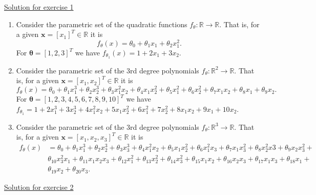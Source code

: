 \documentclass[12pt]{book}
\newcommand{\bb}[1]{\mathbb{#1}}
\newcommand{\R}{\bb{R}}
\begin{document}
{\underline{\large Solution for exercise 1}}
\vspace{0.1 cm}
\begin{enumerate}[label=(\alph*)]
	\item Consider the parametric set of the quadratic functions $f_\theta:\R \rightarrow \R$. That is, for a given $\bm{x} = [x_1]^T \in \R$ it is
	\begin{equation*}
	f_\theta(x) = \theta_0 + \theta_1x_1 + \theta_2x_1^2.
	\end{equation*}
	For $\bm{\theta} = [1,2,3]^T$ we have
	$f_{\theta{_1}}(x) = 1 + 2x_1 + 3x_2$.
	
	\item Consider the parametric set of the 3rd degree polynomials $f_\theta:\R^2 \rightarrow \R$. That is, for a given $\mathbf{x} = [x_1,x_2]^T \in \R$ it is
	\begin{equation*}
	f_\theta(x) = \theta_0 + \theta_1x_1^3 + \theta_2x_2^3 + \theta_3x_1^2x_2 + \theta_4x_1x_2^2 + \theta_5x_1^2 + \theta_6x_2^2 + \theta_7x_1x_2 + \theta_8x_1 + \theta_9x_2.
	\end{equation*}
	For $\bm{\theta} = [1,2,3,4,5,6,7,8,9,10]^T$ we have
	$f_{\theta{_1}} = 1 + 2x_1^3 + 3x_2^3 + 4x_1^2x_2 + 5x_1x_2^2 + 6x_1^2 + 7x_2^2 + 8x_1x_2 + 9x_1 + 10x_2$.
	
	\item Consider the parametric set of the 3rd degree polynomials $f_\theta:\R^3 \rightarrow \R$. That is, for a given $\bm{x} = [x_1,x_2,x_3]^T \in \R$ it is
	\begin{equation*}
	\begin{aligned}
	f_\theta(x) &= \theta_0 +
	 \theta_1x_1^3 +
	  \theta_2x_2^3 +
	   \theta_3x_3^3 +
	    \theta_4x_1^2x_2 +
	     \theta_5x_1x_2^2 +
	      \theta_6x_1^2x_3 +
	       \theta_7x_1x_3^2 +
	        \theta_8x_2^2x3 +
	         \theta_9x_2x_3^2 + \\
	          &\theta_{10}x_3^2x_1 +
	           \theta_{11}x_1x_2x_3 + 
	           \theta_{12}x_1^2 +
	           \theta_{13}x_2^2 +
	           \theta_{14}x_3^2 +
	           \theta_{15}x_1x_2 +
	           \theta_{16}x_2x_3 +
	           \theta_{17}x_1x_3 +
	           \theta_{18}x_1 + \\
	           &\theta_{19}x_2 +
	           \theta_{20}x_3.
	\end{aligned}
	\end{equation*}	
\end{enumerate}
\vspace{0.5 cm}
{\underline{\large Solution for exercise 2}}
\vspace{0.3 cm}
\end{document}
